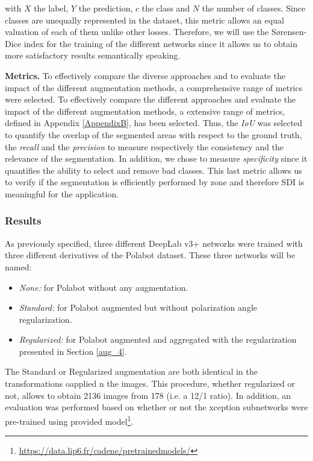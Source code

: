 with  $X$  the label, $Y$ the prediction, $c$ the class and $N$ the number of classes. Since classes are unequally represented in the dataset, this metric allows an equal valuation of each of them unlike other losses.
Therefore, we will use the S\o rensen-Dice index for the training of the different networks since it allows us to obtain more satisfactory results semantically speaking.

\textbf{Metrics. }To effectively compare the diverse approaches and to evaluate the impact of the different augmentation methods, a comprehensive range of metrics were selected.
To effectively compare the different approaches and evaluate the impact of the different augmentation methods, a extensive range of metrics, defined in Appendix \ref{AppendixB}, has been selected. Thus, the \textit{IoU} was selected to quantify the overlap of the segmented areas with respect to the ground truth, the \textit{recall} and the \textit{precision} to measure respectively the consistency and the relevance of the segmentation. In addition, we chose to measure \textit{specificity} since it quantifies the ability to select and remove bad classes. This last metric allows us to verify if the segmentation is efficiently performed by zone and therefore SDI is meaningful for the application.



\subsubsection{Results}

As previously specified, three different DeepLab v3+ networks were trained with three different derivatives of the Polabot dataset.
These three networks will be named:

\begin{itemize}
	\item \emph{None:} for Polabot without any augmentation.
	\item \emph{Standard:} for Polabot augmented but without polarization angle regularization.
	\item \emph{Regularized:} for Polabot augmented and aggregated with the regularization presented in Section \ref{aug_4}.
\end{itemize}

The Standard or Regularized augmentation are both identical in the transformations oapplied n the images. This procedure, whether regularized or not, allows to obtain 2136 images from 178 (i.e. a 12/1 ratio).
In addition, an evaluation was performed based on whether or not the xception subnetworks were pre-trained using provided model\footnote{\url{https://data.lip6.fr/cadene/pretrainedmodels/}}.

